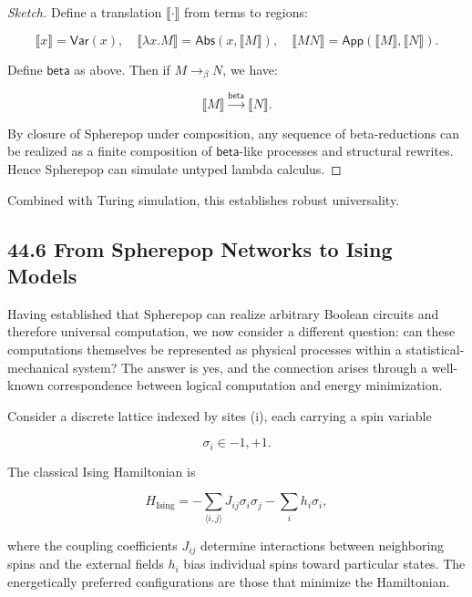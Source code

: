 \documentclass[12pt,letterpaper]{article}
\theoremstyle{remark}
\begin{document}
\begin{proof}[Sketch]
Define a translation $\llbracket \cdot \rrbracket$ from terms to regions:

\[
\llbracket x \rrbracket = \mathsf{Var}(x), \quad
\llbracket \lambda x. M \rrbracket = \mathsf{Abs}(x, \llbracket M \rrbracket), \quad
\llbracket M N \rrbracket = \mathsf{App}(\llbracket M \rrbracket, \llbracket N \rrbracket).
\]

Define $\mathsf{beta}$ as above. Then if $M \to_\beta N$, we have:

\[
\llbracket M \rrbracket \xrightarrow{\mathsf{beta}} \llbracket N \rrbracket.
\]

By closure of Spherepop under composition, any sequence of beta-reductions can be realized as a finite composition of $\mathsf{beta}$-like processes and structural rewrites. Hence Spherepop can simulate untyped lambda calculus.
\end{proof}

Combined with Turing simulation, this establishes robust universality.

\subsection{44.6 From Spherepop Networks to Ising Models}

Having established that Spherepop can realize arbitrary Boolean circuits and therefore universal computation, we now consider a different question: can these computations themselves be represented as physical processes within a statistical-mechanical system? The answer is yes, and the connection arises through a well-known correspondence between logical computation and energy minimization.

Consider a discrete lattice indexed by sites (i), each carrying a spin variable

\[
\sigma_i \in {-1,+1}.
\]

The classical Ising Hamiltonian is

\[
H_{\text{Ising}} =
-\sum_{\langle i,j\rangle}
J_{ij}\sigma_i\sigma_j
-
\sum_i h_i\sigma_i,
\]

where the coupling coefficients $J_{ij}$ determine interactions between neighboring spins and the external fields $h_i$ bias individual spins toward particular states. The energetically preferred configurations are those that minimize the Hamiltonian.
\end{document}
